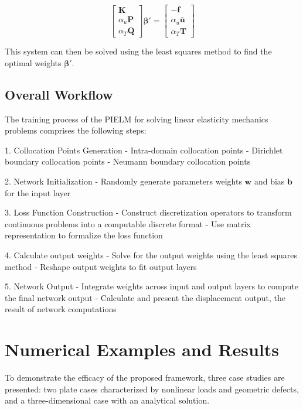 \documentclass[11pt]{article}
\begin{document}
\begin{equation}
\begin{bmatrix} \mathbf{K} \\ \alpha_u\mathbf{P} \\ \alpha_T\mathbf{Q} \end{bmatrix} \boldsymbol{\beta}' = \begin{bmatrix} -\mathbf{f} \\ \alpha_u\bar{\mathbf{u}} \\ \alpha_T\mathbf{T} \end{bmatrix}
\end{equation}

This system can then be solved using the least squares method to find the optimal weights $\boldsymbol{\beta}'$.

\subsection{Overall Workflow}

The training process of the PIELM for solving linear elasticity mechanics problems comprises the following steps:

1. Collocation Points Generation
   - Intra-domain collocation points
   - Dirichlet boundary collocation points
   - Neumann boundary collocation points

2. Network Initialization
   - Randomly generate parameters weights $\mathbf{w}$ and bias $\mathbf{b}$ for the input layer

3. Loss Function Construction
   - Construct discretization operators to transform continuous problems into a computable discrete format
   - Use matrix representation to formalize the loss function

4. Calculate output weights
   - Solve for the output weights using the least squares method
   - Reshape output weights to fit output layers

5. Network Output
   - Integrate weights across input and output layers to compute the final network output
   - Calculate and present the displacement output, the result of network computations

\section{Numerical Examples and Results}

To demonstrate the efficacy of the proposed framework, three case studies are presented: two plate cases characterized by nonlinear loads and geometric defects, and a three-dimensional case with an analytical solution.
\end{document}
